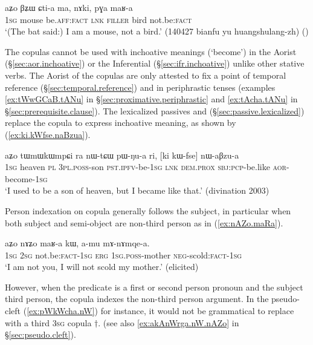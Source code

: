 \begin{exe}
\ex \label{ex:Ctia.ma.maRa}
\gll  aʑo βʑɯ ɕti-a ma, nɤki, pɣa maʁ-a \\
\textsc{1sg} mouse be.\textsc{aff}:\textsc{fact} \textsc{lnk} \textsc{filler} bird not.be:\textsc{fact} \\
\glt  `(The bat said:) I am a mouse, not a bird.' (140427 bianfu yu huangshulang-zh)
()
\end{exe} 

The copulas cannot be used with inchoative meanings (`become')  in the Aorist (§\ref{sec:aor.inchoative}) or the Inferential (§\ref{sec:ifr.inchoative}) unlike other stative verbs. The Aorist of the copulas are only attested to fix a point of temporal reference (§\ref{sec:temporal.reference}) and in periphrastic tenses (examples \ref{ex:tWwGCaB.tANu} in  §\ref{sec:proximative.periphrastic} and \ref{ex:tAcha.tANu} in  §\ref{sec:prerequisite.clause}). The lexicalized passives   and   (§\ref{sec:passive.lexicalized}) replace the copula to express inchoative meaning, as shown by (\ref{ex:ki.kWfse.naBzua}). 

\begin{exe}
\ex \label{ex:ki.kWfse.naBzua}
\gll   aʑo tɯmɯkɯmpɕi ra nɯ-tɕɯ pɯ-ŋu-a ri, [ki kɯ-fse] nɯ-aβzu-a \\
\textsc{1sg} heaven \textsc{pl} \textsc{3pl}.\textsc{poss}-son \textsc{pst}.\textsc{ipfv}-be-\textsc{1sg} \textsc{lnk} \textsc{dem}.\textsc{prox} \textsc{sbj}:\textsc{pcp}-be.like \textsc{aor}-become-\textsc{1sg} \\
\glt `I used to be a son of heaven, but I became like that.' (divination 2003)
\end{exe}

Person indexation on copula generally follows the subject, in particular when both subject and semi-object are non-third person as in (\ref{ex:nAZo.maRa}).

\begin{exe}
\ex \label{ex:nAZo.maRa}
\gll aʑo nɤʑo maʁ-a kɯ, a-mu mɤ-nɤmqe-a. \\
\textsc{1sg} \textsc{2sg} not.be:\textsc{fact}-\textsc{1sg} \textsc{erg} \textsc{1sg}.\textsc{poss}-mother \textsc{neg}-scold:\textsc{fact}-\textsc{1sg} \\
\glt `I am not you, I will not scold my mother.' (elicited)
\end{exe}

However, when the predicate is a first or second person pronoun and the subject third person, the copula indexes the non-third person argument. In the pseudo-cleft (\ref{ex:pWkWcha.nW})  for instance, it would not be  grammatical to  replace   with a third \textsc{3sg} copula $\dagger$. (see also  \ref{ex:akAnWrga.nW.nAZo} in §\ref{sec:pseudo.cleft}).  

